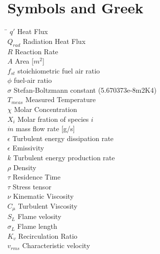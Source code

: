 \section{Symbols and Greek}
\begin{tabbing}
\hspace*{3cm}\= \kill
  $q'$ \> Heat Flux \\
  $Q_{rad}$ \> Radiation Heat Flux \\
  $R$ \> Reaction Rate \\
  $A$ \> Area [$m^2$] \\
  $f_{st}$ \> stoichiometric fuel air ratio \\
  $\phi$ \> fuel-air ratio \\
  $\sigma$ \> Stefan-Boltzmann constant (5.670373e-8m2K4)\\
  $T_{meas}$ \> Measured Temperature \\
  $\chi$ \> Molar Concentration \\
  $X_i$ \> Molar fration of species $i$\\
  $\dot{m}$ \> mass flow rate [g/s] \\
  $\epsilon$ \> Turbulent energy dissipation rate \\
  $\epsilon$ \> Emissivity \\
  $k$ \> Turbulent energy production rate \\
  $\rho$ \> Density \\
  $\tau$ \> Residence Time \\
  $\tau$ \> Stress tensor \\
  $\nu$ \> Kinematic Viscosity \\
  $C_{\mu}$ \> Turbulent Viscosity\\
  $S_L$ \> Flame velosity \\
  $\sigma_{L}$ \> Flame length\\
  $K_v$ \> Recirculation Ratio\\
  $v_{rms}$ \> Characteristic velocity\\
  
  
\end{tabbing}
